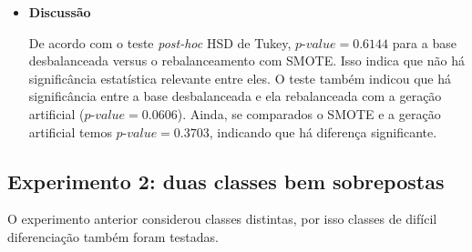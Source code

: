 \begin{itemize}
\item[] \textbf{Discussão}

De acordo com o teste \textit{post-hoc} HSD de Tukey, $\textit{p-value} = 0.6144$ para a base desbalanceada versus o rebalanceamento com SMOTE. Isso indica que não há significância estatística relevante entre eles. O teste também indicou que há significância entre a base desbalanceada e ela rebalanceada com a geração artificial ($\textit{p-value} = 0.0606$). Ainda, se comparados o SMOTE e a geração artificial temos $\textit{p-value} =0.3703$, indicando que há diferença significante.

\end{itemize}

\FloatBarrier
\subsection{Experimento 2: duas classes bem sobrepostas}

O experimento anterior considerou classes distintas, por isso classes de difícil diferenciação também foram testadas.

